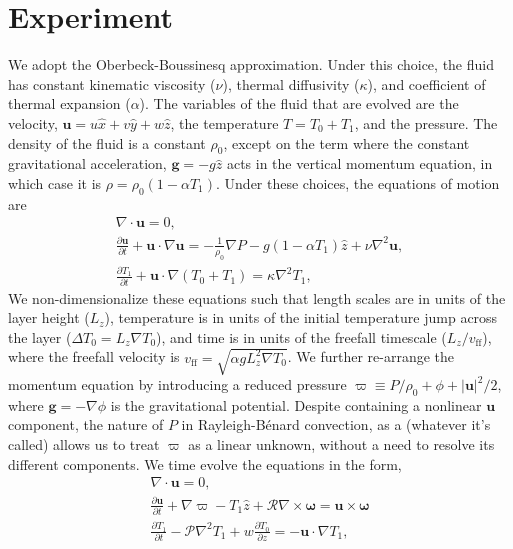 \documentclass[aps, pre, onecolumn, nofootinbib, notitlepage, groupedaddress, amsfonts, amssymb, amsmath, longbibliography]{revtex4-1}
\newcommand{\DivU}{\ensuremath{\nabla\cdot\bm{u}}}
\newcommand{\grad}{\ensuremath{\nabla}}
\newcommand{\RB}{Rayleigh-B\'{e}nard }
\begin{document}
\section{Experiment}
\label{sec:experiment}
We adopt the Oberbeck-Boussinesq approximation.  Under this choice, the
fluid has constant kinematic viscosity ($\nu$), thermal diffusivity ($\kappa$), and coefficient
of thermal expansion ($\alpha$). The variables of the fluid that are evolved are the velocity,
$\bm{u} = u\hat{x} + v\hat{y} + w\hat{z}$, the temperature $T = T_0 + T_1$, and the pressure.
The density of the fluid is a constant $\rho_0$, except on the
term where the constant gravitational acceleration, $\bm{g} = - g\hat{z}$ acts in the vertical momentum equation, 
in which case it is $\rho = \rho_0(1  - \alpha T_1)$.  
Under these choices, the equations of motion are \cite{spiegel&veronis1960}
\begin{gather}
\DivU = 0, 
	\label{eqn:dim_incompressible}
\\
\frac{\partial \bm{u}}{\partial t} + \bm{u}\cdot\grad\bm{u} =
-\frac{1}{\rho_0}\grad P - g( 1 - \alpha T_1)\hat{z} + \nu\grad^2\bm{u}, 
	\label{eqn:dim_bouss_momentum}
\\
\frac{\partial T_1}{\partial t} + \bm{u}\cdot\grad(T_0 + T_1) = \kappa\grad^2 T_1,
	\label{eqn:dim_bouss_energy}
\end{gather}
We non-dimensionalize these equations such that length scales are in units of the layer height ($L_z$),
temperature is in units of the initial temperature jump across the layer ($\Delta T_0 = L_z \grad T_0$), 
and time is in units of the freefall timescale ($L_z / v_{\text{ff}}$), where the freefall velocity is
$v_{\text{ff}} = \sqrt{\alpha g L_z^2 \grad T_0}$.
We further re-arrange the momentum equation by introducing a reduced pressure
$\varpi \equiv P / \rho_0 + \phi + |\bm{u}|^2 / 2$, where $\bm{g} = -\grad \phi$ is the gravitational potential.
Despite containing a nonlinear $\bm{u}$ component, the nature of $P$ in \RB convection, as a (whatever it's called)
allows us to treat $\varpi$ as a linear unknown, without a need to resolve its different components.
We time evolve the equations in the form,
\begin{gather}
\DivU = 0, 
	\label{eqn:incompressible}
\\
\frac{\partial \bm{u}}{\partial t} + \grad \varpi - T_1\hat{z} + \mathcal{R}\grad\times\bm{\omega} = \bm{u}\times\bm{\omega}
	\label{eqn:bouss_momentum}
\\
\frac{\partial T_1}{\partial t} - \mathcal{P}\grad^2 T_1 + w \frac{\partial T_0}{\partial z} = - \bm{u}\cdot\grad T_1,
	\label{eqn:bouss_energy}
\end{gather}
\end{document}
